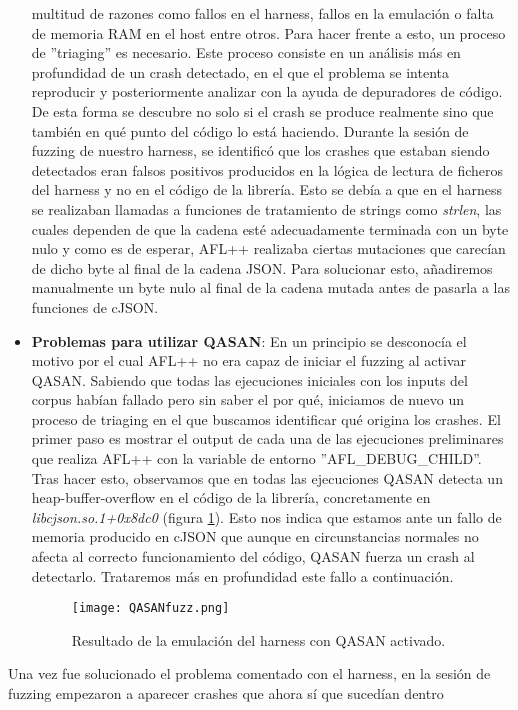 \begin{itemize}
    multitud de razones como fallos en el harness, fallos en la emulación o falta de memoria RAM en el host entre otros. Para hacer frente a esto, 
    un proceso de ''triaging'' es necesario. Este proceso consiste en un análisis más en profundidad de un crash detectado, en el que 
    el problema se intenta reproducir y posteriormente analizar con la ayuda de depuradores de código. De esta forma se descubre no solo 
    si el crash se produce realmente sino que también en qué punto del código lo está haciendo. Durante la sesión de fuzzing de nuestro 
    harness, se identificó que los crashes que estaban siendo detectados eran falsos positivos producidos en la lógica de lectura de 
    ficheros del harness y no en el código de la librería. Esto se debía a que en el harness se realizaban llamadas a funciones de 
    tratamiento de strings como \textit{strlen}, las cuales dependen de que la cadena esté adecuadamente terminada con un byte nulo y 
    como es de esperar, AFL++ realizaba ciertas mutaciones que carecían de dicho byte al final de la cadena JSON. Para solucionar esto,
    añadiremos manualmente un byte nulo al final de la cadena mutada antes de pasarla a las funciones de cJSON. 
    \item \textbf{Problemas para utilizar QASAN}: En un principio se desconocía el motivo por el cual AFL++ no era capaz de iniciar el 
    fuzzing al activar QASAN. Sabiendo que todas las ejecuciones iniciales con los inputs del corpus habían fallado pero sin saber el 
    por qué, iniciamos de nuevo un proceso de triaging en el que buscamos identificar qué origina los crashes. El primer paso es mostrar 
    el output de cada una de las ejecuciones preliminares que realiza AFL++ con la variable de entorno ''AFL\_DEBUG\_CHILD''. Tras hacer esto,
    observamos que en todas las ejecuciones QASAN detecta un heap-buffer-overflow en el código de la librería, concretamente en \textit{libcjson.so.1+0x8dc0}
    (figura \ref{fig:QASANfuzz}). Esto nos indica que estamos ante un fallo de memoria producido en cJSON que aunque en circunstancias normales
    no afecta al correcto funcionamiento del código, QASAN fuerza un crash al detectarlo. Trataremos más en profundidad este fallo a continuación.
    \begin{figure}[H]
        \centering
        \texttt{[image: QASANfuzz.png]}
        \caption{Resultado de la emulación del harness con QASAN activado.}
        \label{fig:QASANfuzz}
    \end{figure}
\end{itemize}
Una vez fue solucionado el problema comentado con el harness, en la sesión de fuzzing empezaron a aparecer crashes que ahora sí que sucedían dentro 
